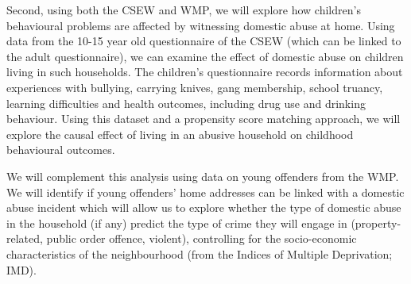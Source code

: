 \documentclass[11pt, a4paper]{article}
\begin{document}
Second, using both the CSEW and WMP, we will explore how children's behavioural problems are affected by witnessing domestic abuse at home. Using data from the 10-15 year old questionnaire of the CSEW (which can be linked to the adult questionnaire), we can examine the effect of domestic abuse on children living in such households. The children's questionnaire records information about experiences with bullying, carrying knives, gang membership, school truancy, learning difficulties and health outcomes, including drug use and drinking behaviour. Using this dataset and a propensity score matching approach, we will explore the causal effect of living in an abusive household on childhood behavioural outcomes.

We will complement this analysis using data on young offenders from the WMP. We will identify if young offenders' home addresses can be linked with a domestic abuse incident which will allow us to explore whether the type of domestic abuse in the household (if any) predict the type of crime they will engage in (property-related, public order offence, violent), controlling for the socio-economic characteristics of the neighbourhood (from the Indices of Multiple Deprivation; IMD).
\end{document}
